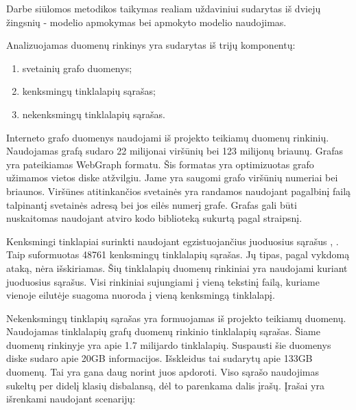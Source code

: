 Darbe siūlomos metodikos taikymas realiam uždaviniui sudarytas iš dviejų žingsnių - modelio apmokymas
bei apmokyto modelio naudojimas.


Analizuojamas duomenų rinkinys yra sudarytas iš trijų komponentų:
\begin{enumerate}
    \item svetainių grafo duomenys;
    \item kenksmingų tinklalapių sąrašas;
    \item nekenksmingų tinklalapių sąrašas.
\end{enumerate}

Interneto grafo duomenys naudojami iš \cite{webgraph} projekto teikiamų duomenų rinkinių. Naudojamas grafą sudaro 22
milijonai viršūnių bei 123 milijonų briaunų. Grafas yra pateikiamas WebGraph formatu. Šis formatas yra optimizuotas
grafo užimamos vietos diske atžvilgiu. Jame yra saugomi grafo viršūnių numeriai bei briaunos. Viršūnes atitinkančios
svetainės yra randamos naudojant pagalbinį failą talpinantį svetainės adresą bei jos eilės numerį grafe. Grafas
gali būti nuskaitomas naudojant atviro kodo biblioteką sukurtą pagal \cite{boldi2004webgraph} straipsnį.

Kenksmingi tinklapiai surinkti naudojant egzistuojančius juoduosius sąrašus \cite{mal1}, \cite{mal2} \cite{mal3}
\cite{mal4}. Taip suformuotas 48761 kenksmingų tinklalapių sąrašas. Jų tipas, pagal vykdomą ataką, nėra išskiriamas.
Šių tinklalapių duomenų rinkiniai yra naudojami kuriant juoduosius sąrašus. Visi rinkiniai sujungiami į vieną tekstinį
failą, kuriame vienoje eilutėje suagoma nuoroda į vieną kenksmingą tinklalapį.


Nekenksmingų tinklapių sąrašas yra formuojamas iš \cite{webgraph} projekto teikiamų duomenų. Naudojamas tinklalapių
grafų duomenų rinkinio tinklalapių sąrašas. Šiame duomenų rinkinyje yra apie 1.7 milijardo tinklalapių. Suspausti
šie duomenys diske sudaro apie 20GB informacijos. Išskleidus tai sudarytų apie 133GB duomenų. Tai yra gana daug
norint juos apdoroti. Viso sąrašo naudojimas sukeltų per didelį klasių disbalansą, dėl to parenkama dalis įrašų.
Įrašai yra išrenkami naudojant scenarijų:

